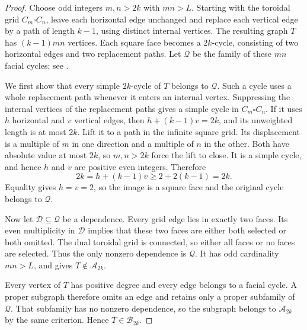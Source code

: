 \documentclass{article}
\theoremstyle{definition}
\theoremstyle{remark}
\begin{document}
\begin{proof}
Choose odd integers $m,n>2k$ with $mn>L$.  Starting with the toroidal grid
$C_m\square C_n$, leave each horizontal edge unchanged and replace each
vertical edge by a path of length $k-1$, using distinct internal vertices.
The resulting graph $T$ has $(k-1)mn$ vertices.  Each square face becomes
a $2k$-cycle, consisting of two horizontal edges and two replacement
paths.  Let $\mathcal Q$ be the family of these $mn$ facial cycles; see
.

We first show that every simple $2k$-cycle of $T$ belongs to $\mathcal Q$.
Such a cycle uses a whole replacement path whenever it enters an internal
vertex.  Suppressing the internal vertices of the replacement paths gives a simple cycle in
$C_m\square C_n$.  If it uses $h$ horizontal and $v$ vertical edges, then
$h+(k-1)v=2k$, and its unweighted length is at most $2k$.  Lift it to a
path in the infinite square grid.  Its displacement is a multiple of $m$
in one direction and a multiple of $n$ in the other.  Both have absolute
value at most $2k$, so $m,n>2k$ force the lift to close.  It is a simple
cycle, and hence $h$ and $v$ are positive even integers.  Therefore
\[
2k=h+(k-1)v\geq2+2(k-1)=2k.
\]
Equality gives $h=v=2$, so the image is a square face and the original
cycle belongs to $\mathcal Q$.

Now let $\mathcal D\subseteq\mathcal Q$ be a dependence.  Every grid edge
lies in exactly two faces.  Its even multiplicity in $\mathcal D$ implies
that these two faces are either both selected or both omitted.  The dual
toroidal grid is connected, so either all faces or no faces are selected.
Thus the only nonzero dependence is $\mathcal Q$.  It has odd cardinality
$mn>L$, and  gives $T\notin\mathcal A_{2k}$.

Every vertex of $T$ has positive degree and every edge belongs to a facial
cycle.  A proper subgraph therefore omits an edge and retains only a proper
subfamily of $\mathcal Q$.  That subfamily has no nonzero dependence, so
the subgraph belongs to $\mathcal A_{2k}$ by the same criterion.  Hence
$T\in\mathcal B_{2k}$.
\end{proof}
\end{document}
